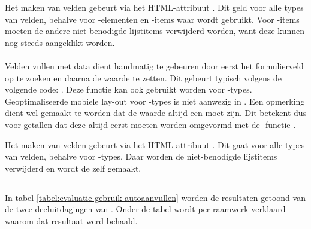 Het  maken van velden gebeurt via het HTML-attribuut .
Dit geld voor alle types van velden, behalve voor -elementen en -items waar  wordt gebruikt.
Voor -items moeten de andere niet-benodigde lijstitems verwijderd worden, want deze kunnen nog steeds aangeklikt worden.

\paragraph{\lungo}
Velden vullen met data dient handmatig te gebeuren door eerst het formulierveld op te zoeken en daarna de waarde te zetten.
Dit gebeurt typisch volgens de volgende code: .
Deze functie kan ook gebruikt worden voor -types.
Geoptimaliseerde mobiele lay-out voor -types is niet aanwezig in \lungo.
Een opmerking dient wel gemaakt te worden dat de waarde altijd een  moet zijn.
Dit betekent dus voor getallen dat deze altijd eerst moeten worden omgevormd met de \js{}-functie . 

Het  maken van velden gebeurt via het HTML-attribuut .
Dit gaat voor alle types van velden, behalve voor -types.
Daar worden de niet-benodigde lijstitems verwijderd en wordt de  zelf  gemaakt.


\subsection{}
\label{sec:evaluatie-gebruik-autoaanvullen}

In tabel \ref{tabel:evaluatie-gebruik-autoaanvullen} worden de resultaten getoond van de twee deeluitdagingen van .
Onder de tabel wordt per raamwerk verklaard waarom dat resultaat werd behaald.

\begin{table}[H]
\centering
{}
\caption{Gebruik van  voor \st{}~(\sta), \kendo{}~(\kendoa), \jqm{}~(\jqma) en \lungo{}~(\lungoa).}
\label{tabel:evaluatie-gebruik-autoaanvullen}
\end{table}

